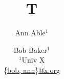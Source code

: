 \documentclass{article}
\begin{document}
\title{T}
\author{Ann Able$^1$ \and Bob Baker$^1$\\
$^1$Univ X\\
\{\url{bob, ann}\}\url{@x.org}}
\maketitle
\end{document}
